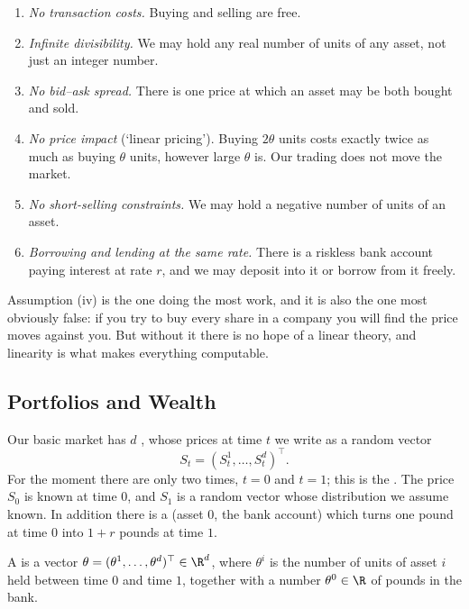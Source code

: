 \begin{enumerate}[label=(\roman*)]
	\item \emph{No transaction costs.} Buying and selling are free.
	\item \emph{Infinite divisibility.} We may hold any real number of units of any asset, not just an integer number.
	\item \emph{No bid--ask spread.} There is one price at which an asset may be both bought and sold.
	\item \emph{No price impact} (`linear pricing'). Buying $2\theta$ units costs exactly twice as much as buying $\theta$ units, however large $\theta$ is. Our trading does not move the market.
	\item \emph{No short-selling constraints.} We may hold a negative number of units of an asset.
	\item \emph{Borrowing and lending at the same rate.} There is a riskless bank account paying interest at rate $r$, and we may deposit into it or borrow from it freely.
\end{enumerate}

Assumption (iv) is the one doing the most work, and it is also the one most obviously false: if you try to buy every share in a company you will find the price moves against you. But without it there is no hope of a linear theory, and linearity is what makes everything computable.

\subsection{Portfolios and Wealth}

Our basic market has $d$ , whose prices at time $t$ we write as a random vector
$$
S_t = (S_t^1, \dots, S_t^d)^\top.
$$
For the moment there are only two times, $t = 0$ and $t = 1$; this is the . The price $S_0$ is known at time $0$, and $S_1$ is a random vector whose distribution we assume known. In addition there is a  (asset $0$, the bank account) which turns one pound at time $0$ into $1 + r$ pounds at time $1$.

\begin{definition}[Portfolio]
	A  is a vector $\theta = (\theta^1, \dots, \theta^d)^\top \in \R^d$, where $\theta^i$ is the number of units of asset $i$ held between time $0$ and time $1$, together with a number $\theta^0 \in \R$ of pounds in the bank.
\end{definition}

